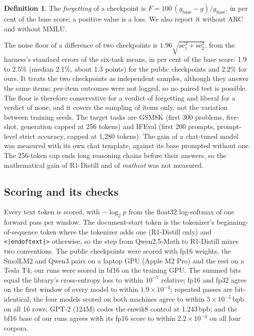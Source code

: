 \documentclass[11pt,a4paper]{article}
\theoremstyle{definition}
\newtheorem*{definition}{Definition}
\newcommand{\mathcot}{\textit{mathcot}}
\begin{document}
\begin{definition}
The \emph{forgetting} of a checkpoint is $F=100\,(g_{\mathrm{base}}-g)/g_{\mathrm{base}}$, in per cent of the
base score; a positive value is a loss. We also report it without ARC and without MMLU.
\end{definition}

\noindent The noise floor of a difference of two checkpoints is $1.96\sqrt{\mathrm{se}_1^2+\mathrm{se}_2^2}$, from
the harness's standard errors of the six-task means, in per cent of the base score: 1.9 to 2.5\% (median 2.1\%,
about 1.3 points) for the public checkpoints and 2.2\% for ours. It treats the two checkpoints as independent
samples, although they answer the same items; per-item outcomes were not logged, so no paired test is possible.
The floor is therefore conservative for a verdict of forgetting and liberal for a verdict of none, and it covers
the sampling of items only, not the variation between training seeds. The target tasks are GSM8K (first 300
problems, five-shot, generation capped at 256 tokens) and IFEval (first 200 prompts, prompt-level strict accuracy,
capped at 1,280 tokens). The gain of a chat-tuned model was measured with its own chat template, against its base
prompted without one. The 256-token cap ends long reasoning chains before their answers, so the mathematical gain
of R1-Distill and of \mathcot{} was not measured.

\subsection{Scoring and its checks}
\label{sec:checks}

Every text token is scored, with $-\log_2 p$ from the float32 log-softmax of one forward pass per window. The
document-start token is the tokenizer's beginning-of-sequence token where the tokenizer adds one (R1-Distill only)
and \texttt{<|endoftext|>} otherwise, so the step from Qwen2.5-Math to R1-Distill mixes two conventions. The public
checkpoints were scored with fp16 weights, the SmolLM2 and Qwen3 pairs on a laptop GPU (Apple M2 Pro) and the
rest on a Tesla T4; our runs were scored in bf16 on the training GPU. The summed bits equal the library's
cross-entropy loss to within $10^{-7}$ relative; fp16 and fp32 agree on the first window of every model to within
$1.9\times10^{-4}$; repeated passes are bit-identical; the four models scored on both machines agree to within
$5\times10^{-5}$\,bpb on all 16 rows; GPT-2 (124M) codes the enwik8 control at 1.243\,bpb; and the bf16 base of
our runs agrees with its fp16 score to within $2.2\times10^{-4}$ on all four corpora.
\end{document}
